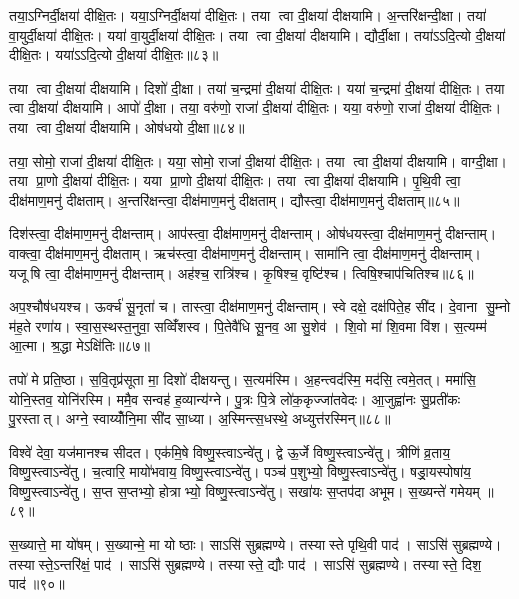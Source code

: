 तया॒ऽग्निर्दी॒क्षया॑ दीक्षि॒तः। यया॒ऽग्निर्दी॒क्षया॑ दीक्षि॒तः। तया त्वा दी॒क्षया॑ दीक्षयामि। अ॒न्तरि॑क्षन्दी॒क्षा। तया॑ वा॒युर्दी॒क्षया॑ दीक्षि॒तः। यया॑ वा॒युर्दी॒क्षया॑ दीक्षि॒तः। तया त्वा दी॒क्षया॑ दीक्षयामि। द्यौर्दी॒क्षा। तया॑ऽऽदि॒त्यो दी॒क्षया॑ दीक्षि॒तः। यया॑ऽऽदि॒त्यो दी॒क्षया॑ दीक्षि॒तः॥८३॥

तया त्वा दी॒क्षया॑ दीक्षयामि। दिशो॑ दी॒क्षा। तया॑ च॒न्द्रमा॑ दी॒क्षया॑ दीक्षि॒तः। यया॑ च॒न्द्रमा॑ दी॒क्षया॑ दीक्षि॒तः। तया त्वा दी॒क्षया॑ दीक्षयामि। आपो॑ दी॒क्षा। तया॒ वरु॑णो॒ राजा॑ दी॒क्षया॑ दीक्षि॒तः। यया॒ वरु॑णो॒ राजा॑ दी॒क्षया॑ दीक्षि॒तः। तया त्वा दी॒क्षया॑ दीक्षयामि। ओष॑धयो दी॒क्षा॥८४॥

तया॒ सोमो॒ राजा॑ दी॒क्षया॑ दीक्षि॒तः। यया॒ सोमो॒ राजा॑ दी॒क्षया॑ दीक्षि॒तः। तया त्वा दी॒क्षया॑ दीक्षयामि। वाग्दी॒क्षा। तया प्रा॒णो दी॒क्षया॑ दीक्षि॒तः। यया प्रा॒णो दी॒क्षया॑ दीक्षि॒तः। तया त्वा दी॒क्षया॑ दीक्षयामि। पृ॒थि॒वी त्वा॒ दीक्ष॑माण॒मनु॑ दीक्षताम्। अ॒न्तरि॑क्षन्त्वा॒ दीक्ष॑माण॒मनु॑ दीक्षताम्। द्यौस्त्वा॒ दीक्ष॑माण॒मनु॑ दीक्षताम्॥८५॥

दिश॑स्त्वा॒ दीक्ष॑माण॒मनु॑ दीक्षन्ताम्। आप॑स्त्वा॒ दीक्ष॑माण॒मनु॑ दीक्षन्ताम्। ओष॑धयस्त्वा॒ दीक्ष॑माण॒मनु॑ दीक्षन्ताम्। वाक्त्वा॒ दीक्ष॑माण॒मनु॑ दीक्षताम्। ऋच॑स्त्वा॒ दीक्ष॑माण॒मनु॑ दीक्षन्ताम्। सामा॑नि त्वा॒ दीक्ष॑माण॒मनु॑ दीक्षन्ताम्। यजूषि त्वा॒ दीक्ष॑माण॒मनु॑ दीक्षन्ताम्। अह॑श्च॒ रात्रि॑श्च। कृ॒षिश्च॒ वृष्टि॑श्च। त्विषि॒श्चाप॑चितिश्च॥८६॥

अप॒श्चौष॑धयश्च। ऊर्क्च॑ सू॒नृता॑ च। तास्त्वा॒ दीक्ष॑माण॒मनु॑ दीक्षन्ताम्। स्वे दक्षे॒ दक्ष॑पिते॒ह सी॑द। दे॒वाना सु॒म्नो म॑ह॒ते रणा॑य। स्वा॒स॒स्थस्त॒नुवा॒ सव्विँ॑शस्व। पि॒तेवै॑धि सू॒नव॒ आ सु॒शेव॑। शि॒वो मा॑ शि॒वमा वि॑श। स॒त्यम्म॑ आ॒त्मा। श्र॒द्धा मेऽक्षि॑तिः॥८७॥

तपो॑ मे प्रति॒ष्ठा। स॒वि॒तृप्र॑सूता मा॒ दिशो॑ दीक्षयन्तु। स॒त्यम॑स्मि। अ॒हन्त्वद॑स्मि॒ मद॑सि॒ त्वमे॒तत्। ममा॑सि॒ योनि॒स्तव॒ योनि॑रस्मि। ममै॒व सन्वह॑ ह॒व्यान्य॑ग्ने। पु॒त्रः पि॒त्रे लो॑क॒कृज्जा॑तवेदः। आ॒जुह्वा॑नः सु॒प्रती॑कः पु॒रस्तात्। अग्ने॒ स्वाय्योँनि॒मा सी॑द सा॒ध्या। अ॒स्मिन्त्स॒धस्थे॒ अध्युत्त॑रस्मिन्॥८८॥

विश्वे॑ देवा॒ यज॑मानश्च सीदत। एक॑मि॒षे विष्णु॒स्त्वाऽन्वे॑तु। द्वे ऊ॒र्जे विष्णु॒स्त्वाऽन्वे॑तु। त्रीणि॑ व्र॒ताय॒ विष्णु॒स्त्वाऽन्वे॑तु। च॒त्वारि॒ मायो॑भवाय॒ विष्णु॒स्त्वाऽन्वे॑तु। पञ्च॑ प॒शुभ्यो॒ विष्णु॒स्त्वाऽन्वे॑तु। षड्रा॒यस्पोषा॑य॒ विष्णु॒स्त्वाऽन्वे॑तु। स॒प्त स॒प्तभ्यो॒ होत्राभ्यो॒ विष्णु॒स्त्वाऽन्वे॑तु। सखा॑यः स॒प्तप॑दा अभूम। स॒ख्यन्ते॑ गमेयम् ॥८९॥

स॒ख्यात्ते॒ मा यो॑षम्। स॒ख्यान्मे॒ मा योष्ठाः। साऽसि॑ सुब्रह्मण्ये। तस्यास्ते पृथि॒वी पाद॑। साऽसि॑ सुब्रह्मण्ये। तस्यास्ते॒ऽन्तरि॑क्षं॒ पाद॑। साऽसि॑ सुब्रह्मण्ये। तस्यास्ते॒ द्यौः पाद॑। साऽसि॑ सुब्रह्मण्ये। तस्यास्ते॒ दिश॒ पाद॑॥९०॥

